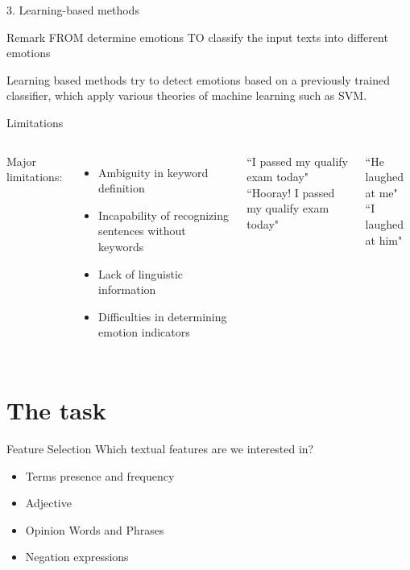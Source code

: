 \documentclass[xcolor=dvipsnames]{beamer}
\begin{document}
\begin{frame}{3. Learning-based methods}
\begin{block}{Remark}
FROM determine emotions TO classify the input texts into different emotions
\end{block}
Learning based methods try to detect emotions based on a previously trained classifier, which apply various theories of machine learning such as SVM.
\end{frame}

\begin{frame}{Limitations}
\begin{columns}
Major limitations:
\begin{itemize}
\item Ambiguity in keyword definition
\item Incapability of recognizing sentences without keywords
\item Lack of linguistic information
\item Difficulties in determining emotion indicators
\end{itemize}
\begin{example}
``I passed my qualify exam today"\\
``Hooray! I passed my qualify exam today"
\end{example}
\begin{example}
``He laughed at me"\\
``I laughed at him"
\end{example}
\end{columns}
\end{frame}



\section{The task}

\begin{frame}{Feature Selection}
Which textual features are we interested in?
\begin{itemize}
\item Terms presence and frequency
\item Adjective
\item Opinion Words and Phrases
\item Negation expressions
\end{itemize}
\end{frame}
\end{document}
